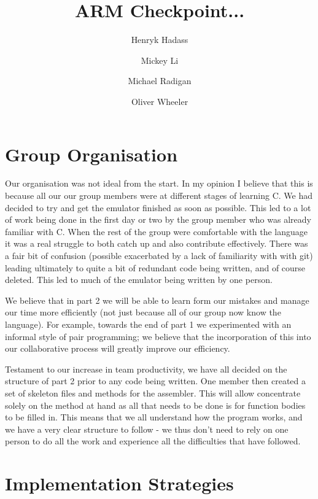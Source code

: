\documentclass[11pt]{article}
\begin{document}
\title{ARM Checkpoint... }
\author{Henryk Hadass \and Mickey Li \and Michael Radigan \and Oliver Wheeler}
\maketitle

\section{Group Organisation}

Our organisation was not ideal from the start. In my opinion I believe that this is because all our our group members were at different stages of learning C. We had decided to try and get the emulator finished as soon as possible. This led to a lot of work being done in the first day or two by the group member who was already familiar with C. When the rest of the group were comfortable with the language it was a real struggle to both catch up and also contribute effectively. There was a fair bit of confusion (possible exacerbated by a lack of familiarity with with git) leading ultimately to quite a bit of redundant code being written, and of course deleted. This led to much of the emulator being written by one person.

We believe that in part 2 we will be able to learn form our mistakes and manage our time more efficiently (not just because all of our group now know the language). For example, towards the end of part 1 we experimented with an informal style of pair programming; we believe that the incorporation of this into our collaborative process will greatly improve our efficiency.

Testament to our increase in team productivity, we have all decided on the structure of part 2 prior to any code being written. One member then created a set of skeleton files and methods for the assembler. This will allow concentrate solely on the method at hand as all that needs to be done is for function bodies to be filled in. This means that we all understand how the program works, and we have a very clear structure to follow - we thus don't need to rely on one person to do all the work and experience all the difficulties that have followed.



\section{Implementation Strategies}
\end{document}
